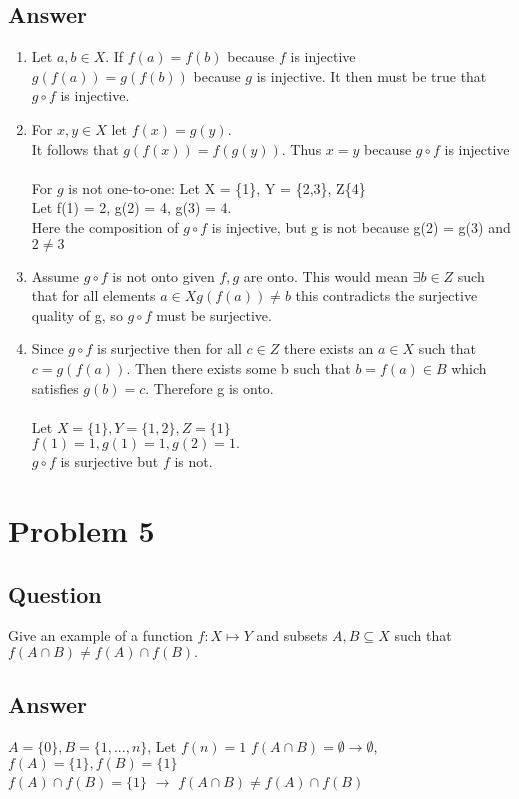 \documentclass{article}
\begin{document}
\subsection*{Answer}
\begin{enumerate}[label=\alph*]
\item Let \(a,b \in X\). If \(f(a) = f(b)\) because \(f\) is injective \\ \(g(f(a)) = g(f(b))\) because \(g\) is injective. It then must be true that \(g \circ f\) is injective. 
\item For \(x,y \in X\) let \(f(x) = g(y)\). \\ It follows that \(g(f(x)) = f(g(y))\). Thus \(x = y\) because \(g \circ f\) is injective \\ \\  For \(g\) is not one-to-one: Let X = \{1\}, Y = \{2,3\}, Z\{4\} \\ Let f(1) = 2, g(2) = 4, g(3) = 4.\\ Here the composition of \(g \circ f\) is injective, but g is not because g(2) = g(3) and  \(2 \ne 3\) 
\item Assume \(g \circ f\) is not onto given \(f, g\) are onto. This would mean \(\exists b \in Z\) such that for all elements \(a \in X g(f(a))\ne b\) this contradicts the surjective quality of g, so \(g \circ f\) must be surjective. 
\item Since \(g \circ f\) is surjective then for all \(c \in Z\) there exists an \(a \in X\) such that \(c = g(f(a))\). Then there exists some b such that \(b = f(a) \in B\) which satisfies \(g(b) = c\). Therefore g is onto. \\ \\ Let \(X = \{1\}, Y = \{1,2\}, Z = \{1\}\) \\ \(f(1) = 1, g(1) = 1, g(2) = 1.\) \\ \(g \circ f\) is surjective but \(f\) is not.   
\end{enumerate}
\section*{Problem 5}
\subsection*{Question}
Give an example of a function \(f: X \mapsto Y\) and subsets \(A, B \subseteq X\) such that \(f(A \cap B) \ne f(A) \cap f(B).\)
\subsection*{Answer}
\(A = \{0\}, B = \{1,...,n\}\), Let \(f(n) = 1\) \(f(A \cap B) = \emptyset \rightarrow \emptyset\), \(f(A) = \{1\}, f(B) = \{1\}\) \\ \(f(A) \cap f(B) = \{1\}\) \(\rightarrow\) \(f(A \cap B) \ne f(A) \cap f(B)\)
\end{document}
